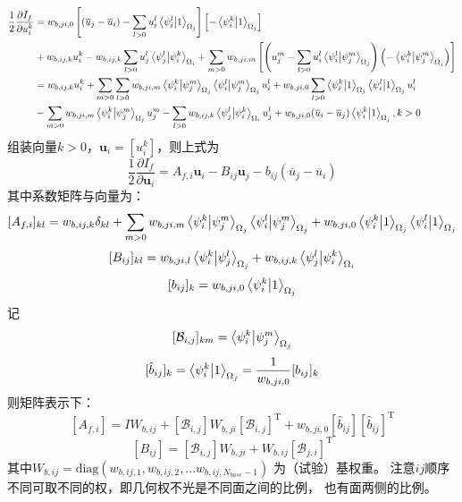 \documentclass[UTF8,zihao=5]{ctexart} %
\newcommand{\bm}[1]{{\mathbf{#1}}}
\newcommand{\trans}[0]{^\mathrm{T}}
\newcommand*{\pd}[2]{\frac{\partial #1}{\partial #2}}
\newcommand*{\uu}[0]{\bm{u}}
\newcommand*{\mean}[1]{\overline{#1}}
\begin{document}
$$
    \begin{aligned}
        \frac{1}{2}\pd{I_f}{u_i^k}
         & =
        w_{b,ji,0}\left[
            (\mean{u}_j - \mean{u}_i)
            - \sum_{l>0}u_i^l\innerproduct{\psi_i^l}{1}_{\Omega_j}
            \right]\left[
            - \innerproduct{\psi_i^k}{1}_{\Omega_j}
            \right]
        \\
         & +
        w_{b,ij,k} u_i^k
        - w_{b,ij,k}\sum_{l>0}u_j^l\innerproduct{\psi_j^l}{\psi_i^k}_{\Omega_i}
        +
        \sum_{m>0}
        w_{b,ji,m}\left[
            {\left(
                    u_j^m
                    - \sum_{l>0}u_i^l\innerproduct{\psi_i^l}{\psi_j^m}_{\Omega_j}
                    \right)\left(
                    - \innerproduct{\psi_i^k}{\psi_j^m}_{\Omega_j}
                    \right)}
        \right]                                                                                             \\
         & =
        w_{b,ij,k}u_i^k +
        \sum_{m>0}\sum_{l>0}w_{b,ji,m}
        \innerproduct{\psi_i^k}{\psi_j^m}_{\Omega_j}
        \innerproduct{\psi_i^l}{\psi_j^m}_{\Omega_j}u_i^l +
        w_{b,ji,0}\sum_{l>0}\innerproduct{\psi_i^k}{1}_{\Omega_j}\innerproduct{\psi_i^l}{1}_{\Omega_j}u_i^l \\
         &
        - \sum_{m>0}w_{b,ji,m}\innerproduct{\psi_i^k}{\psi_j^m}_{\Omega_j}u_j^m
        - \sum_{l>0}w_{b,ij,k}\innerproduct{\psi_j^l}{\psi_i^k}_{\Omega_i}u_j^l
        + w_{b,ji,0}(\mean{u}_i - \mean{u}_j)\innerproduct{\psi_i^k}{1}_{\Omega_j}
        , k>0
    \end{aligned}
$$
组装向量$k>0$，$\uu_i=[u_i^k]$，则上式为
$$
    \frac{1}{2}\pd{I_f}{\uu_i} = A_{f,i} \uu_i - B_{ij} \uu_j -
    b_{ij}(\mean{u}_j - \mean{u}_i )
$$
其中系数矩阵与向量为：
$$
    [A_{f,i}]_{kl} = w_{b,ij,k} \delta_{kl} +
    \sum_{m>0}
    w_{b,ji,m}
    \innerproduct{\psi_i^k}{\psi_j^m}_{\Omega_j}
    \innerproduct{\psi_i^l}{\psi_j^m}_{\Omega_j}
    +
    w_{b,ji,0}
    \innerproduct{\psi_i^k}{1}_{\Omega_j}
    \innerproduct{\psi_i^l}{1}_{\Omega_j}
$$
$$
    [B_{ij}]_{kl} =
    w_{b,ji,l}\innerproduct{\psi_i^k}{\psi_j^l}_{\Omega_j}
    +
    w_{b,ij,k}\innerproduct{\psi_j^l}{\psi_i^k}_{\Omega_i}
$$
$$
    [b_{ij}]_{k} =
    w_{b,ji,0}\innerproduct{\psi_i^k}{1}_{\Omega_j}
$$
记
$$
    [\mathcal{B}_{i,j}]_{km}=\innerproduct{\psi_i^k}{\psi_j^m}_{\Omega_j}
$$
$$
    [\hat{b}_{ij}]_{k} =
    \innerproduct{\psi_i^k}{1}_{\Omega_j}=\frac{1}{w_{b,ji,0}}[b_{ij}]_{k}
$$
则矩阵表示下：
$$
    [A_{f,i}] = I W_{b,ij} +
    [\mathcal{B}_{i,j}] W_{b,ji} [\mathcal{B}_{i,j}]\trans
    +
    w_{b,ji,0}
        [\hat{b}_{ij}][\hat{b}_{ij}]\trans
$$
$$
    [B_{ij}] =
    [\mathcal{B}_{i,j}]W_{b,ji}
    +
    W_{b,ij}[\mathcal{B}_{j,i}]\trans
$$
其中$W_{b,ij}=\text{diag}(w_{b,ij,1},w_{b,ij,2},...w_{b,ij,N_{base}-1})$
为（试验）基权重。
注意$ij$顺序不同可取不同的权，即几何权不光是不同面之间的比例，
也有面两侧的比例。
\end{document}
